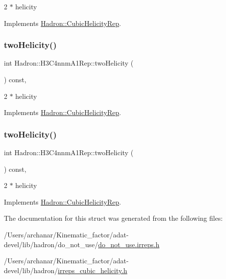 2 $\ast$ helicity 

Implements \mbox{\hyperlink{structHadron_1_1CubicHelicityRep_af507aa56fc2747eacc8cb6c96db31ecc}{Hadron\+::\+Cubic\+Helicity\+Rep}}.

\mbox{\label{structHadron_1_1H3C4nnmA1Rep_af309cb443b7986be792a59cbf09758c3}} 
\subsubsection{\texorpdfstring{twoHelicity()}{twoHelicity()}\hspace{0.1cm}{\footnotesize\ttfamily [2/3]}}
{\footnotesize\ttfamily int Hadron\+::\+H3\+C4nnm\+A1\+Rep\+::two\+Helicity (\begin{DoxyParamCaption}{ }\end{DoxyParamCaption}) const\hspace{0.3cm}{\ttfamily [inline]}, {\ttfamily [virtual]}}

2 $\ast$ helicity 

Implements \mbox{\hyperlink{structHadron_1_1CubicHelicityRep_af507aa56fc2747eacc8cb6c96db31ecc}{Hadron\+::\+Cubic\+Helicity\+Rep}}.

\mbox{\label{structHadron_1_1H3C4nnmA1Rep_af309cb443b7986be792a59cbf09758c3}} 
\subsubsection{\texorpdfstring{twoHelicity()}{twoHelicity()}\hspace{0.1cm}{\footnotesize\ttfamily [3/3]}}
{\footnotesize\ttfamily int Hadron\+::\+H3\+C4nnm\+A1\+Rep\+::two\+Helicity (\begin{DoxyParamCaption}{ }\end{DoxyParamCaption}) const\hspace{0.3cm}{\ttfamily [inline]}, {\ttfamily [virtual]}}

2 $\ast$ helicity 

Implements \mbox{\hyperlink{structHadron_1_1CubicHelicityRep_af507aa56fc2747eacc8cb6c96db31ecc}{Hadron\+::\+Cubic\+Helicity\+Rep}}.



The documentation for this struct was generated from the following files\+:\begin{DoxyCompactItemize}
\item 
/\+Users/archanar/\+Kinematic\+\_\+factor/adat-\/devel/lib/hadron/do\+\_\+not\+\_\+use/\mbox{\hyperlink{adat-devel_2lib_2hadron_2do__not__use_2do__not__use_8irreps_8h}{do\+\_\+not\+\_\+use.\+irreps.\+h}}\item 
/\+Users/archanar/\+Kinematic\+\_\+factor/adat-\/devel/lib/hadron/\mbox{\hyperlink{adat-devel_2lib_2hadron_2irreps__cubic__helicity_8h}{irreps\+\_\+cubic\+\_\+helicity.\+h}}\end{DoxyCompactItemize}
